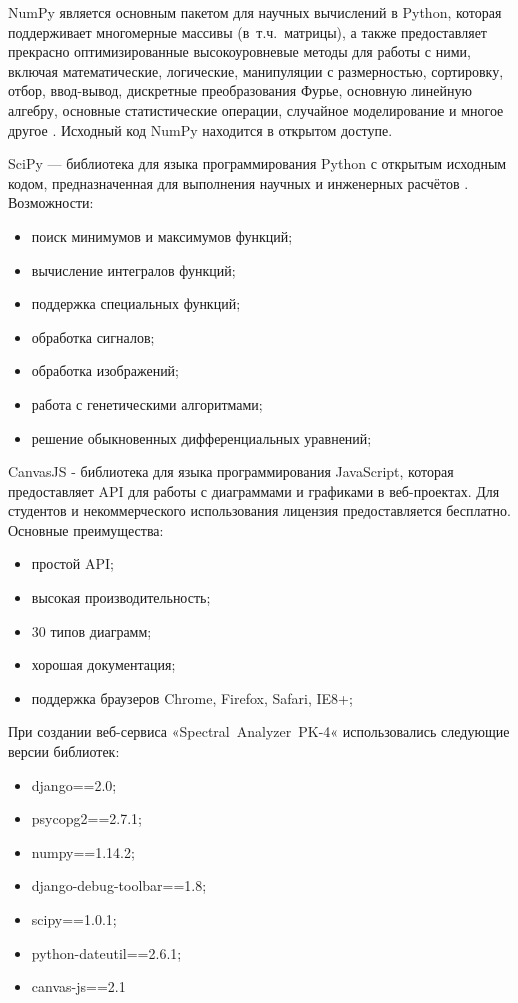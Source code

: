 NumPy является основным пакетом для научных вычислений в Python, которая поддерживает
многомерные массивы (в~т.ч.~матрицы), а также предоставляет прекрасно оптимизированные высокоуровневые методы для работы с ними,
включая математические, логические, манипуляции с размерностью, сортировку, отбор, ввод-вывод, дискретные преобразования Фурье,
основную линейную алгебру, основные статистические операции, случайное моделирование и многое другое \cite{Numpy}.
Исходный код NumPy находится в открытом доступе.

SciPy — библиотека для языка программирования Python с открытым исходным кодом, предназначенная для выполнения научных и
инженерных расчётов \cite{Scipy}. Возможности:
\begin{itemize}
\item поиск минимумов и максимумов функций;
\item вычисление интегралов функций;
\item поддержка специальных функций;
\item обработка сигналов;
\item обработка изображений;
\item работа с генетическими алгоритмами;
\item решение обыкновенных дифференциальных уравнений;
\end{itemize}

CanvasJS - библиотека для языка программирования JavaScript, которая предоставляет API для работы с диаграммами и графиками
в веб-проектах. Для студентов и некоммерческого использования лицензия предоставляется бесплатно. Основные преимущества:
\begin{itemize}
\item простой API;
\item высокая производительность;
\item 30 типов диаграмм;
\item хорошая документация;
\item поддержка браузеров Chrome, Firefox, Safari, IE8+;
\end{itemize}

При создании веб-сервиса «Spectral~Analyzer~PK-4« использовались следующие версии библиотек:
\begin{itemize}
\item django==2.0;
\item psycopg2==2.7.1;
\item numpy==1.14.2;
\item django-debug-toolbar==1.8;
\item scipy==1.0.1;
\item python-dateutil==2.6.1;
\item canvas-js==2.1
\end{itemize}

